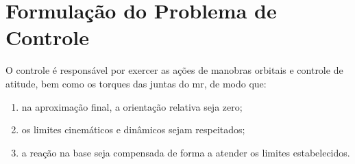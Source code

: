 \section{Formulação do Problema de Controle}
\label{sec:definicao_problema_controle}

O controle é responsável por exercer as ações de manobras orbitais e controle de atitude, bem como os torques das juntas do \gls{mr}, de modo que:

\begin{enumerate}[label=(\roman*)]
  \item na aproximação final, a orientação relativa seja zero;
  \item os limites cinemáticos e dinâmicos sejam respeitados;
  \item a reação na base seja compensada de forma a atender os limites estabelecidos.
\end{enumerate}

% 

% 

% 